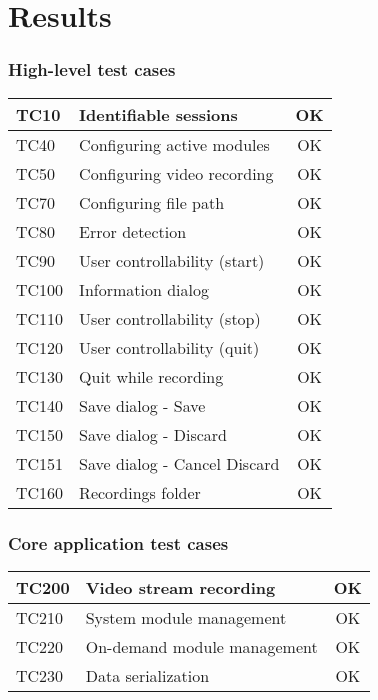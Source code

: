 \chapter{Results}

\subsection{High-level test cases}

\begin{tabular}{|l|l|c|}
    \hline
    TC10 & Identifiable sessions & \cellcolor{green!25}OK \\ \hline
    TC40 & Configuring active modules & \cellcolor{green!25}OK \\ \hline
    TC50 & Configuring video recording & \cellcolor{green!25}OK \\ \hline
    TC70 & Configuring file path & \cellcolor{green!25}OK \\ \hline
    TC80 & Error detection & \cellcolor{green!25}OK \\ \hline
    TC90 & User controllability (start) & \cellcolor{green!25}OK \\ \hline
    TC100 & Information dialog & \cellcolor{green!25}OK \\ \hline
    TC110 & User controllability (stop) & \cellcolor{green!25}OK \\ \hline
    TC120 & User controllability (quit) & \cellcolor{green!25}OK \\ \hline
    TC130 & Quit while recording & \cellcolor{green!25}OK \\ \hline
    TC140 & Save dialog - Save & \cellcolor{green!25}OK \\ \hline
    TC150 & Save dialog - Discard & \cellcolor{green!25}OK \\ \hline
    TC151 & Save dialog - Cancel Discard & \cellcolor{green!25}OK \\ \hline
    TC160 & Recordings folder & \cellcolor{green!25}OK \\ \hline
\end{tabular}

\subsection{Core application test cases}

\begin{tabular}{|l|l|c|}
    \hline
    TC200 & Video stream recording & \cellcolor{green!25}OK \\ \hline
    TC210 & System module management & \cellcolor{green!25}OK \\ \hline
    TC220 & On-demand module management & \cellcolor{green!25}OK \\ \hline
    TC230 & Data serialization & \cellcolor{green!25}OK \\ \hline
\end{tabular}

